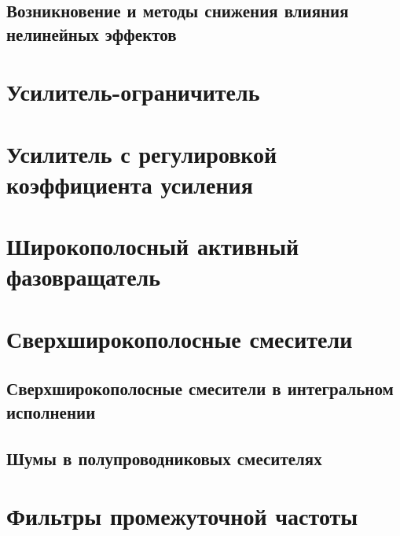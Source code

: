 \subsection{Возникновение и методы снижения влияния нелинейных эффектов}

\section{Усилитель-ограничитель}

\section{Усилитель с регулировкой коэффициента усиления}

\section{Широкополосный активный фазовращатель}

\section{Сверхширокополосные смесители}

\subsection{Сверхширокополосные смесители в интегральном исполнении}

\subsection{Шумы в полупроводниковых смесителях}

\section{Фильтры промежуточной частоты}